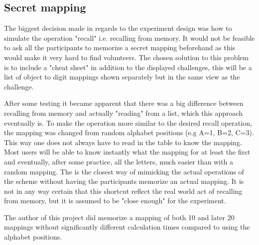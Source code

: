 \subsection{Secret mapping} The biggest decision made in regards to the experiment design was how to simulate the operation "recall" i.e. recalling from memory. It would not be feasible to ask all the participants to memorize a secret mapping beforehand as this would make it very hard to find volunteers. The chosen solution to this problem is to include a "cheat sheet" in addition to the displayed challenges, this will be a list of object to digit mappings shown separately but in the same view as the challenge.
\par After some testing it became apparent that there was a big difference between recalling from memory and actually "reading" from a list, which this approach eventually is. To make the operation more similar to the desired recall operation, the mapping was changed from random alphabet positions (e.g A=1, B=2, C=3). This way one does not always have to read in the table to know the mapping. Most users will be able to know instantly what the mapping for at least the first and eventually, after some practice, all the letters, much easier than with a random mapping. The is the closest way of mimicking the actual operations of the scheme without having the participants memorize an actual mapping. It is not in any way certain that this shortcut reflect the real world act of recalling from memory, but it is assumed to be "close enough" for the experiment. 
\begin{remark}
The author of this project did memorize a mapping of both 10 and later 20 mappings without significantly different calculation times compared to using the alphabet positions.
\end{remark}

